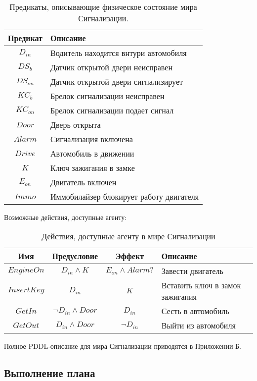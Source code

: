 \begin{table}[h]
\centering
\begin{tabular}{c | l}
 Предикат & Описание \\
 \hline
 $D_{in}$ & Водитель находится внтури автомобиля\\
 $DS_b$ & Датчик открытой двери неисправен \\
 $DS_{on}$ & Датчик открытой двери сигнализирует \\
 $KC_b$ & Брелок сигнализации неисправен \\
 $KC_{on}$ & Брелок сигнализации подает сигнал \\
 $Door$ & Дверь открыта \\
 $Alarm$ & Сигнализация включена \\
 $Drive$ & Автомобиль в движении \\
 $K$ & Ключ зажигания в замке \\
 $E_{on}$ & Двигатель включен \\
 $Immo$ & Иммобилайзер блокирует работу двигателя \\
 \hline
\end{tabular}
\caption{Предикаты, описывающие физическое состояние мира Сигнализации.}
\end{table}

Возможные действия, доступные агенту:
\begin{table}[h]
  \centering
  \begin{tabular}{c | c | c | p{5cm} }
    Имя & Предусловие & Эффект & Описание \\
   \hline
   $EngineOn$ & $D_{in} \land K$ & $E_{on} \land Alarm?$ & Завести двигатель\\
   $InsertKey$ & $D_{in}$ & $K$ & Вставить ключ в замок зажигания \\
   $GetIn$ & $\neg D_{in} \land Door$ & $D_{in}$ & Сесть в автомобиль\\
   $GetOut$ & $D_{in}\land Door$ & $\neg D_{in}$ & Выйти из автомобиля\\
   \hline
  \end{tabular}
 \caption{Действия, доступные агенту в мире Сигнализации}
\end{table}


Полное PDDL-описание для мира Сигнализации приводятся в Приложении Б.

\subsection{Выполнение плана}
\label{sec:plantemplates}

